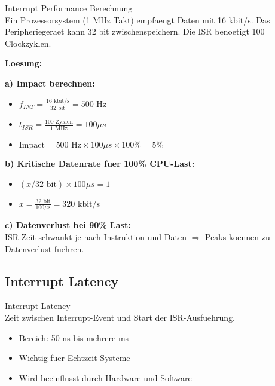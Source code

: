 \begin{example2}{Interrupt Performance Berechnung}\\
    Ein Prozessorsystem (1 MHz Takt) empfaengt Daten mit 16 kbit/s. Das Peripheriegeraet kann 32 bit zwischenspeichern. Die ISR benoetigt 100 Clockzyklen.
    
    \tcblower
    
    \textbf{Loesung:}
    
    \textbf{a) Impact berechnen:}
    \begin{itemize}
        \item $f_{INT} = \frac{16 \text{ kbit/s}}{32 \text{ bit}} = 500 \text{ Hz}$
        \item $t_{ISR} = \frac{100 \text{ Zyklen}}{1 \text{ MHz}} = 100 \mu s$
        \item $\text{Impact} = 500 \text{ Hz} \times 100 \mu s \times 100\% = 5\%$
    \end{itemize}
    
    \textbf{b) Kritische Datenrate fuer 100\% CPU-Last:}
    \begin{itemize}
        \item $(x / 32 \text{ bit}) \times 100 \mu s = 1$
        \item $x = \frac{32 \text{ bit}}{100 \mu s} = 320 \text{ kbit/s}$
    \end{itemize}
    
    \textbf{c) Datenverlust bei 90\% Last:}
    \\ ISR-Zeit schwankt je nach Instruktion und Daten $\Rightarrow$ Peaks koennen zu Datenverlust fuehren.
\end{example2}

\subsection{Interrupt Latency}

\begin{definition}{Interrupt Latency}\\
    Zeit zwischen Interrupt-Event und Start der ISR-Ausfuehrung.
    \begin{itemize}
        \item Bereich: 50 ns bis mehrere ms
        \item Wichtig fuer Echtzeit-Systeme
        \item Wird beeinflusst durch Hardware und Software
    \end{itemize}
\end{definition}

